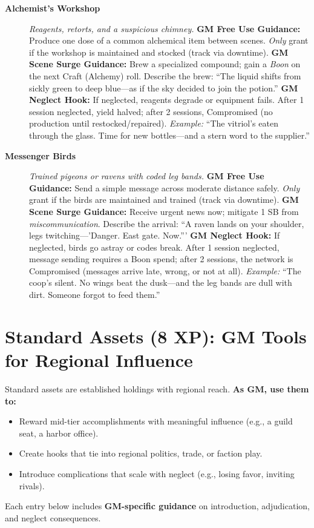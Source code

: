 \begin{description}
  \item[\textbf{Alchemist's Workshop}]   
        \emph{Reagents, retorts, and a suspicious chimney.}  
        \textbf{GM Free Use Guidance:} Produce one dose of a common alchemical item between scenes. \emph{Only} grant if the workshop is maintained and stocked (track via downtime).  
        \textbf{GM Scene Surge Guidance:} Brew a specialized compound; gain a \emph{Boon} on the next Craft (Alchemy) roll. Describe the brew: ``The liquid shifts from sickly green to deep blue---as if the sky decided to join the potion.''  
        \textbf{GM Neglect Hook:} If neglected, reagents degrade or equipment fails. After 1 session neglected, yield halved; after 2 sessions, Compromised (no production until restocked/repaired).  
        \textit{Example:} ``The vitriol's eaten through the glass. Time for new bottles---and a stern word to the supplier.''  

  \item[\textbf{Messenger Birds}]   
        \emph{Trained pigeons or ravens with coded leg bands.}  
        \textbf{GM Free Use Guidance:} Send a simple message across moderate distance safely. \emph{Only} grant if the birds are maintained and trained (track via downtime).  
        \textbf{GM Scene Surge Guidance:} Receive urgent news now; mitigate 1 SB from \emph{miscommunication}. Describe the arrival: ``A raven lands on your shoulder, legs twitching---'Danger. East gate. Now.'''  
        \textbf{GM Neglect Hook:} If neglected, birds go astray or codes break. After 1 session neglected, message sending requires a Boon spend; after 2 sessions, the network is Compromised (messages arrive late, wrong, or not at all).  
        \textit{Example:} ``The coop's silent. No wings beat the dusk---and the leg bands are dull with dirt. Someone forgot to feed them.''  
\end{description}

\section{Standard Assets (8 XP): GM Tools for Regional Influence}
\label{sec:standard-assets}
Standard assets are established holdings with regional reach. \textbf{As GM, use them to:}  
\begin{itemize}
  \item Reward mid-tier accomplishments with meaningful influence (e.g., a guild seat, a harbor office).  
  \item Create hooks that tie into regional politics, trade, or faction play.  
  \item Introduce complications that scale with neglect (e.g., losing favor, inviting rivals).  
\end{itemize}
Each entry below includes \textbf{GM-specific guidance} on introduction, adjudication, and neglect consequences.

